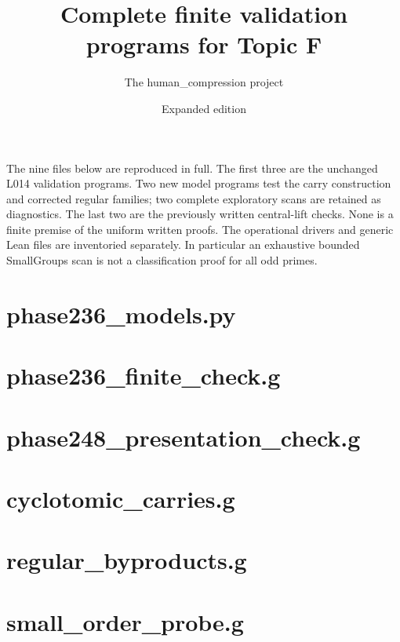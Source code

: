 
\title{Complete finite validation programs for Topic F}
\author{The human\_compression project}\date{Expanded edition}
\maketitle
The nine files below are reproduced in full. The first three are the
unchanged L014 validation programs. Two new model programs test the
carry construction and corrected regular families; two complete
exploratory scans are retained as diagnostics. The last two are the
previously written central-lift checks. None is a finite premise of
the uniform written proofs. The operational drivers and generic Lean
files are inventoried separately. In particular an exhaustive bounded
SmallGroups scan is not a classification proof for all odd primes.
\section*{\textsf{phase236\_models.py}}
\section*{\textsf{phase236\_finite\_check.g}}
\section*{\textsf{phase248\_presentation\_check.g}}
\section*{\textsf{cyclotomic\_carries.g}}
\section*{\textsf{regular\_byproducts.g}}
\section*{\textsf{small\_order\_probe.g}}
